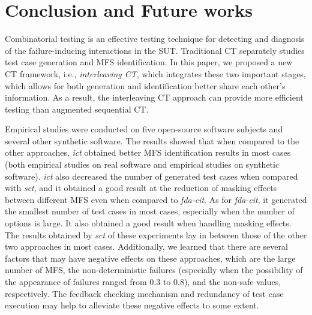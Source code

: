 \documentclass[journal,12pt,onecolumn,draftclsnofoot,]{IEEEtran}
\begin{document}
%


\section{Conclusion and Future works}\label{sec:conclusion}
Combinatorial testing is an effective testing technique for detecting and diagnosis of the failure-inducing interactions in the SUT. Traditional CT separately studies test case generation and MFS identification. In this paper, we proposed a new CT framework, i.e., \emph{interleaving CT}, which integrates these two important stages, which allows for both generation and identification better share each other's information. As a result, the interleaving CT approach can provide more efficient testing than augmented sequential CT.

Empirical studies were conducted on five open-source software subjects {\color{red} and several other synthetic software. The results showed that when compared to the other approaches, \emph{ict} obtained better MFS identification results in most cases (both empirical studies on real software and empirical studies on synthetic software). \emph{ict} also decreased the number of generated test cases when compared with \emph{sct}, and it obtained a good result at the reduction of masking effects between different MFS even when compared to \emph{fda-cit}. As for \emph{fda-cit}, it generated the smallest number of test cases in most cases, especially when the number of options is large. It also obtained a good result when handling masking effects. The results obtained by \emph{sct} of these experiments lay in between those of the other two approaches in most cases. Additionally, we learned that there are several factors that may have negative effects on these approaches, which are the large number of MFS, the non-deterministic failures (especially when the possibility of the appearance of failures ranged from 0.3 to 0.8), and the non-safe values, respectively. The feedback checking mechanism and redundancy of test case execution may help to alleviate these negative effects to some extent.
}

\end{document}
